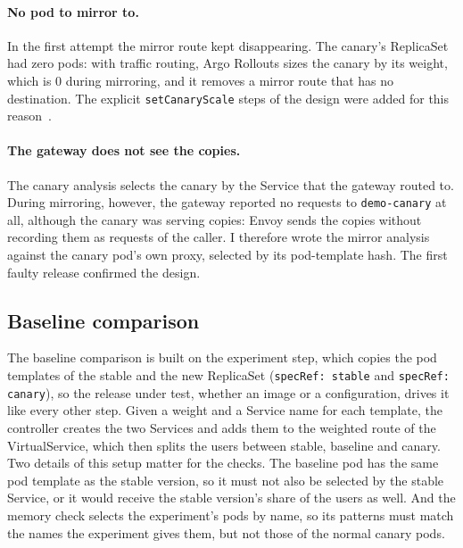 \paragraph{No pod to mirror to.} In the first attempt the mirror route kept disappearing. The canary's ReplicaSet had zero pods: with traffic routing, Argo Rollouts sizes the canary by its weight, which is 0 during mirroring, and it removes a mirror route that has no destination. The explicit \texttt{setCanaryScale} steps of the design were added for this reason~\cite{ArgoRolloutsCanary}.

\paragraph{The gateway does not see the copies.} The canary analysis selects the canary by the Service that the gateway routed to. During mirroring, however, the gateway reported no requests to \texttt{demo-canary} at all, although the canary was serving copies: Envoy sends the copies without recording them as requests of the caller. I therefore wrote the mirror analysis against the canary pod's own proxy, selected by its pod-template hash. The first faulty release confirmed the design.

\subsection{Baseline comparison}
\label{sec:ImplExperiment}
The baseline comparison is built on the experiment step, which copies the pod templates of the stable and the new ReplicaSet (\texttt{specRef: stable} and \texttt{specRef: canary}), so the release under test, whether an image or a configuration, drives it like every other step. Given a weight and a Service name for each template, the controller creates the two Services and adds them to the weighted route of the VirtualService, which then splits the users between stable, baseline and canary. Two details of this setup matter for the checks. The baseline pod has the same pod template as the stable version, so it must not also be selected by the stable Service, or it would receive the stable version's share of the users as well. And the memory check selects the experiment's pods by name, so its patterns must match the names the experiment gives them, but not those of the normal canary pods.

